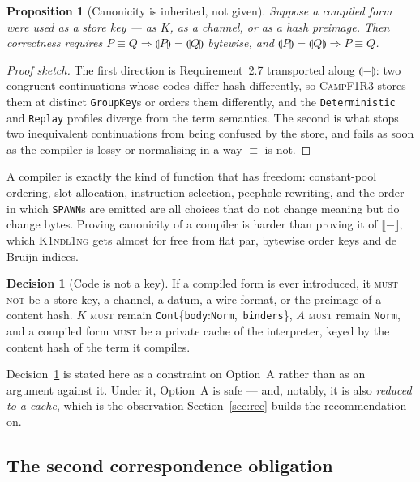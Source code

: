 \documentclass[11pt,a4paper]{article}
\newcommand{\code}[1]{\texttt{#1}}
\newcommand{\Kind}{\textsc{K1ndl1ng}}
\newcommand{\Camp}{\textsc{CampF1R3}}
\newcommand{\MUST}{\textsc{must}}
\newcommand{\MUSTNOT}{\textsc{must not}}
\newcommand{\enc}[1]{\llbracket #1 \rrbracket}
\newcommand{\cmp}[1]{\llparenthesis #1 \rrparenthesis}
\newcommand{\Norm}{\code{Norm}}
\theoremstyle{definition}
\newtheorem{decision}[definition]{Decision}
\theoremstyle{plain}
\newtheorem{proposition}[definition]{Proposition}
\begin{document}
\begin{proposition}[Canonicity is inherited, not given]\label{prop:canon}
Suppose a compiled form were used as a store key --- as $K$, as a channel, or as
a hash preimage. Then correctness requires $P\equiv Q \Rightarrow
\cmp{P}=\cmp{Q}$ bytewise, and $\cmp{P}=\cmp{Q}\Rightarrow P\equiv Q$.
\end{proposition}
\begin{proof}[Proof sketch]
The first direction is Requirement~2.7 transported along $\cmp{-}$: two
congruent continuations whose codes differ hash differently, so \Camp{} stores
them at distinct \code{GroupKey}s or orders them differently, and the
\code{Deterministic} and \code{Replay} profiles diverge from the term semantics.
The second is what stops two inequivalent continuations from being confused by
the store, and fails as soon as the compiler is lossy or normalising in a way
$\equiv$ is not.
\end{proof}

\noindent
A compiler is exactly the kind of function that has freedom: constant-pool
ordering, slot allocation, instruction selection, peephole rewriting, and the
order in which \code{SPAWN}s are emitted are all choices that do not change
meaning but do change bytes. Proving canonicity of a compiler is harder than
proving it of $\enc{-}$, which \Kind{} gets almost for free from flat par,
bytewise order keys and de Bruijn indices.

\begin{decision}[Code is not a key]\label{dec:notakey}
If a compiled form is ever introduced, it \MUSTNOT{} be a store key, a channel,
a datum, a wire format, or the preimage of a content hash. $K$ \MUST{} remain
\code{Cont}\{\code{body}:\Norm,\ \code{binders}\}, $A$ \MUST{} remain \Norm, and
a compiled form \MUST{} be a private cache of the interpreter, keyed by the
content hash of the term it compiles.
\end{decision}

\noindent
Decision~\ref{dec:notakey} is stated here as a constraint on Option~A rather
than as an argument against it. Under it, Option~A is safe --- and, notably, it
is also \emph{reduced to a cache}, which is the observation
Section~\ref{sec:rec} builds the recommendation on.

\subsection{The second correspondence obligation}\label{sec:proof}
\end{document}
